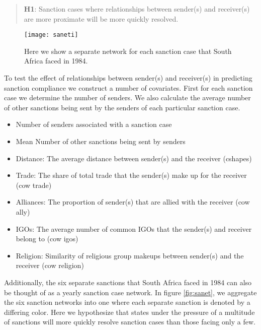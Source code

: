
\begin{quote}
	\textbf{H1}: Sanction cases where relationships between sender(s) and receiver(s) are more proximate will be more quickly resolved.
\end{quote}

\begin{figure}[ht]
	\centering
	\texttt{[image: saneti]}
	\caption{Here we show a separate network for each sanction case that South Africa faced in 1984.}
	\label{fig:saneti}
\end{figure}
\FloatBarrier

To test the effect of relationships between sender(s) and receiver(s) in predicting sanction compliance we construct a number of covariates. First for each sanction case we determine the number of senders. We also calculate the average number of other sanctions being sent by the senders of each particular sanction case.  

	\begin{itemize}
		\item Number of senders associated with a sanction case
		\item Mean Number of other sanctions being sent by senders
		\item Distance: The average distance between sender(s) and the receiver (cshapes)
		\item Trade: The share of total trade that the sender(s) make up for the receiver (cow trade)
		\item Alliances: The proportion of sender(s) that are allied with the receiver (cow ally)
		\item IGOs: The average number of common IGOs that the sender(s) and receiver belong to (cow igos)
		\item Religion: Similarity of religious group makeups between sender(s) and the receiver (cow religion)
	\end{itemize}

Additionally, the six separate sanctions that South Africa faced in 1984 can also be thought of as a yearly sanction case network. In figure \ref{fig:sanet}, we aggregate the six sanction networks into one where each separate sanction is denoted by a differing color. Here we hypothesize that states under the pressure of a multitude of sanctions will more quickly resolve sanction cases than those facing only a few.

